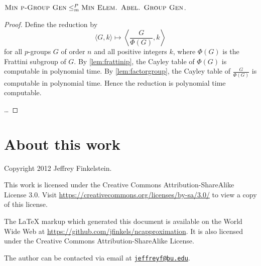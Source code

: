 \documentclass{article}
\newcommand{\email}[1]{\href{mailto:#1}{\nolinkurl{#1}}}
\begin{document}
\begin{proposition}
  $\textsc{Min p-Group Gen} \leq_m^P \textsc{Min Elem. Abel. Group Gen}$.
\end{proposition}
\begin{proof}
  Define the reduction by
  \begin{equation*}
    \langle G, k \rangle \mapsto \left\langle \frac{G}{\Phi(G)}, k \right\rangle
  \end{equation*}
  for all $p$-groups $G$ of order $n$ and all positive integers $k$, where $\Phi(G)$ is the Frattini subgroup of $G$.
  By \autoref{lem:frattinip}, the Cayley table of $\Phi(G)$ is computable in polynomial time.
  By \autoref{lem:factorgroup}, the Cayley table of $\frac{G}{\Phi(G)}$ is computable in polynomial time.
  Hence the reduction is polynomial time computable.

  \ldots
\end{proof}

\section{About this work}

Copyright 2012 Jef{}frey Finkelstein.

This work is licensed under the Creative Commons Attribution-ShareAlike License 3.0.
Visit \mbox{\url{https://creativecommons.org/licenses/by-sa/3.0/}} to view a copy of this license.

The \LaTeX{} markup which generated this document is available on the World Wide Web at \mbox{\url{https://github.com/jfinkels/ncapproximation}}.
It is also licensed under the Creative Commons Attribution-ShareAlike License.

The author can be contacted via email at \email{jeffreyf@bu.edu}.



\end{document}
